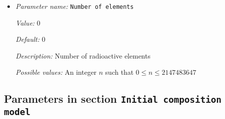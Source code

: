 \begin{itemize}
{\it Possible values:} A list of 0 to 4294967295 elements where each element is [A floating point number $v$ such that $0 \leq v \leq \text{MAX\_DOUBLE}$]
\item {\it Parameter name:} {\tt Number of elements}
\label{parameters:Heating model/Radioactive decay/Number of elements}
\label{parameters:Heating_20model/Radioactive_20decay/Number_20of_20elements}


{\it Value:} 0


{\it Default:} 0


{\it Description:} Number of radioactive elements


{\it Possible values:} An integer $n$ such that $0\leq n \leq 2147483647$
\end{itemize}

\subsection{Parameters in section \tt Initial composition model}
\label{parameters:Initial_20composition_20model}

